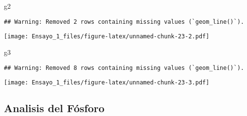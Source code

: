 \documentclass[
]{article}
\newenvironment{Shaded}{\begin{snugshade}}{\end{snugshade}}
\newcommand{\NormalTok}[1]{#1}
\begin{document}
\begin{Shaded}
\begin{Highlighting}[]
\NormalTok{g2}
\end{Highlighting}
\end{Shaded}

\begin{verbatim}
## Warning: Removed 2 rows containing missing values (`geom_line()`).
\end{verbatim}

\texttt{[image: Ensayo\_1\_files/figure-latex/unnamed-chunk-23-2.pdf]}

\begin{Shaded}
\begin{Highlighting}[]
\NormalTok{g3}
\end{Highlighting}
\end{Shaded}

\begin{verbatim}
## Warning: Removed 8 rows containing missing values (`geom_line()`).
\end{verbatim}

\texttt{[image: Ensayo\_1\_files/figure-latex/unnamed-chunk-23-3.pdf]}

\hypertarget{analisis-del-fuxf3sforo}{%
\subsection{Analisis del Fósforo}\label{analisis-del-fuxf3sforo}}
\end{document}
